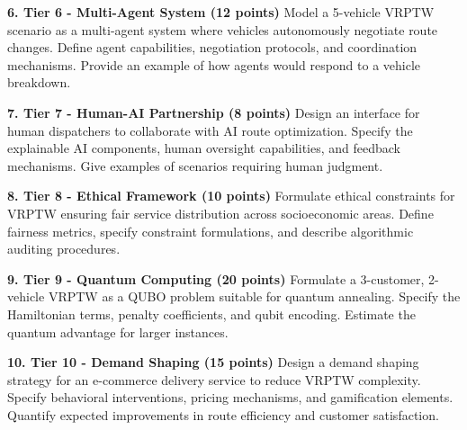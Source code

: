\documentclass{article}
\begin{document}
\textbf{6. Tier 6 - Multi-Agent System (12 points)}
Model a 5-vehicle VRPTW scenario as a multi-agent system where vehicles autonomously negotiate route changes. Define agent capabilities, negotiation protocols, and coordination mechanisms. Provide an example of how agents would respond to a vehicle breakdown.

\textbf{7. Tier 7 - Human-AI Partnership (8 points)}
Design an interface for human dispatchers to collaborate with AI route optimization. Specify the explainable AI components, human oversight capabilities, and feedback mechanisms. Give examples of scenarios requiring human judgment.

\textbf{8. Tier 8 - Ethical Framework (10 points)}
Formulate ethical constraints for VRPTW ensuring fair service distribution across socioeconomic areas. Define fairness metrics, specify constraint formulations, and describe algorithmic auditing procedures.

\textbf{9. Tier 9 - Quantum Computing (20 points)}
Formulate a 3-customer, 2-vehicle VRPTW as a QUBO problem suitable for quantum annealing. Specify the Hamiltonian terms, penalty coefficients, and qubit encoding. Estimate the quantum advantage for larger instances.

\textbf{10. Tier 10 - Demand Shaping (15 points)}
Design a demand shaping strategy for an e-commerce delivery service to reduce VRPTW complexity. Specify behavioral interventions, pricing mechanisms, and gamification elements. Quantify expected improvements in route efficiency and customer satisfaction.
\end{document}
